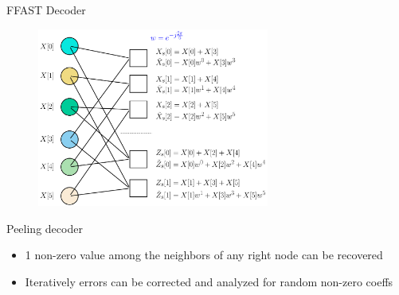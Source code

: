 	\begin{frame}{FFAST Decoder}
		
		
%			
%				
%			
			\vspace{-5pt}
			\begin{figure}[t]
				
				\includegraphics[width=3.0in]{./Figures/Factorgraph_example_tilde}
			\end{figure}
		\begin{block}{Peeling decoder}
			\begin{itemize}
				\item 1 non-zero value among the neighbors of any right node can be recovered
				
				\item Iteratively errors can be corrected and analyzed for random non-zero coeffs
			\end{itemize}
		\end{block}
	\end{frame}	

